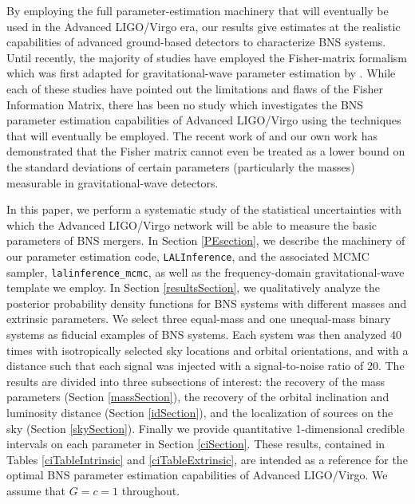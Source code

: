 \documentclass[11pt,a4paper]{emulateapj} 
\begin{document}
By employing the full parameter-estimation machinery that will
eventually be used in the Advanced LIGO/Virgo era, our results give
 estimates at the realistic capabilities of
advanced ground-based detectors to characterize BNS systems.  Until
recently, the majority of studies have employed the Fisher-matrix
formalism which was first adapted for gravitational-wave parameter
estimation by \citet{FinnDetection}.  While each of these studies
\citep{PoissonWill,CutlerFlanagan,ArunPE} have pointed out the
limitations and flaws of the Fisher Information Matrix, there has been
no study which investigates the BNS parameter estimation capabilities
of Advanced LIGO/Virgo using the techniques that will eventually be
employed.  The recent work of \cite{Vallisneri} and our own work
\citep{Inadequacies} has demonstrated that the Fisher matrix cannot
even be treated as a lower bound on the standard deviations of certain
parameters (particularly the masses) measurable in gravitational-wave
detectors.

In this paper, we perform a systematic study of the statistical
uncertainties with which the Advanced LIGO/Virgo network will be able
to measure the basic parameters of BNS mergers.  In Section
\ref{PEsection}, we describe the machinery of our parameter estimation
code, \texttt{LALInference}, and the associated MCMC sampler,
\texttt{lalinference\_mcmc}, as well as the frequency-domain
gravitational-wave template we employ.  In Section
\ref{resultsSection}, we qualitatively analyze the posterior
probability density functions for BNS systems with different masses
and extrinsic parameters.  We select three equal-mass and one unequal-mass
 binary systems as fiducial examples of BNS systems.  Each system was then analyzed 40 
 times with isotropically selected sky locations and orbital orientations, and with a distance
 such that each signal was injected with a signal-to-noise ratio of 20.
  The results are divided into three subsections of interest: the recovery of the mass
parameters (Section \ref{massSection}), the recovery of the orbital
inclination and luminosity distance (Section \ref{idSection}), and the
localization of sources on the sky (Section \ref{skySection}).
Finally we provide quantitative 1-dimensional credible intervals on
each parameter in Section \ref{ciSection}.  These results, contained
in Tables \ref{ciTableIntrinsic} and \ref{ciTableExtrinsic}, are
intended as a reference for the optimal BNS parameter estimation
capabilities of Advanced LIGO/Virgo.  We assume that $G=c=1$
throughout.
\end{document}
